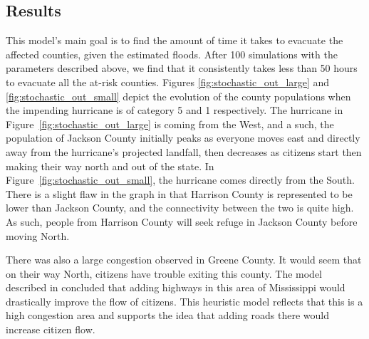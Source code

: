 \documentclass[titlepage]{article}
\begin{document}
  \subsection{Results}
    \par This model's main goal is to find the amount of time it takes to evacuate the affected counties, given the estimated floods. After 100 simulations with the parameters described above, we find that it consistently takes less than 50 hours to evacuate all the at-risk counties. Figures \ref{fig:stochastic_out_large} and \ref{fig:stochastic_out_small} depict the evolution of the county populations when the impending hurricane is of category 5 and 1 respectively. The hurricane in Figure~\ref{fig:stochastic_out_large} is coming from the West, and a such, the population of Jackson County initially peaks as everyone moves east and directly away from the hurricane's projected landfall, then decreases as citizens start then making their way north and out of the state. In Figure~\ref{fig:stochastic_out_small}, the hurricane comes directly from the South. There is a slight flaw in the graph in that Harrison County is represented to be lower than Jackson County, and the connectivity between the two is quite high. As such, people from Harrison County will seek refuge in Jackson County before moving North.
    \par There was also a large congestion observed in Greene County. It would seem that on their way North, citizens have trouble exiting this county. The model described in  concluded that adding highways in this area of Mississippi would drastically improve the flow of citizens. This heuristic model reflects that this is a high congestion area and supports the idea that adding roads there would increase citizen flow.
\end{document}
